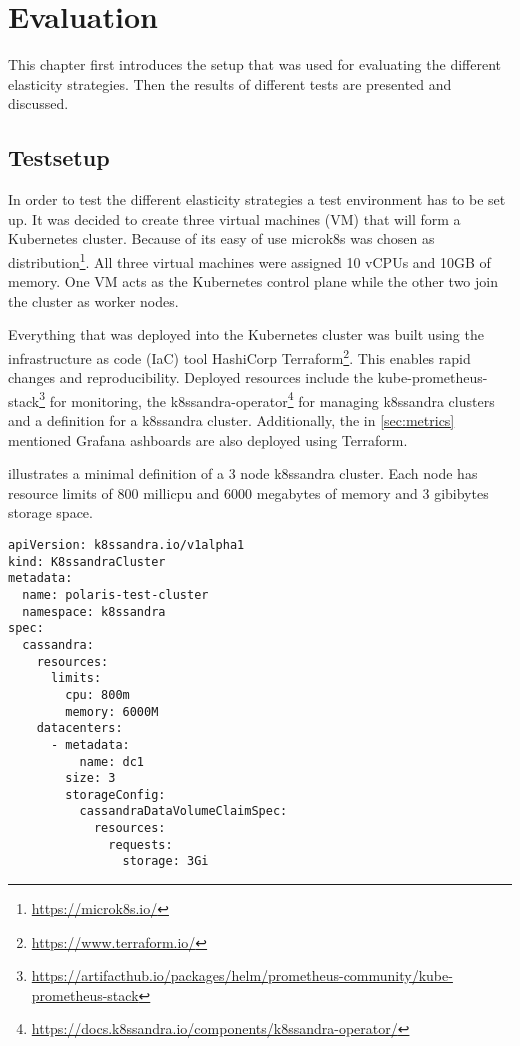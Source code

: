 \chapter{Evaluation}
\label{ch:evaluation}

This chapter first introduces the setup that was used for evaluating the different elasticity strategies. Then the results of different tests are presented and discussed.

\section{Testsetup}
\label{sec:testsetup}

In order to test the different elasticity strategies a test environment has to be set up. It was decided to create three virtual machines (VM) that will form a Kubernetes cluster. Because of its easy of use microk8s was chosen as distribution\footnote{\url{https://microk8s.io/}}. All three virtual machines were assigned 10 vCPUs and 10GB of memory. One VM acts as the Kubernetes control plane while the other two join the cluster as worker nodes.

Everything that was deployed into the Kubernetes cluster was built using the infrastructure as code (IaC) tool HashiCorp Terraform\footnote{\url{https://www.terraform.io/}}. This enables rapid changes and reproducibility. Deployed resources include the kube-prometheus-stack\footnote{\raggedright\url{https://artifacthub.io/packages/helm/prometheus-community/kube-prometheus-stack}} for monitoring, the k8ssandra-operator\footnote{\url{https://docs.k8ssandra.io/components/k8ssandra-operator/}} for managing k8ssandra clusters and a definition for a k8ssandra cluster. Additionally, the in \cref{sec:metrics} mentioned Grafana ashboards are also deployed using Terraform.

 illustrates a minimal definition of a 3 node k8ssandra cluster. Each node has resource limits of 800 millicpu and 6000 megabytes of memory and 3 gibibytes storage space.

\begin{lstlisting}[caption={Minimal example of a K8ssandraCluster definition.},
                label=lst:k8c,
                captionpos=b,
                float]
apiVersion: k8ssandra.io/v1alpha1
kind: K8ssandraCluster
metadata:
  name: polaris-test-cluster
  namespace: k8ssandra
spec:
  cassandra:
    resources:
      limits:
        cpu: 800m
        memory: 6000M
    datacenters:
      - metadata:
          name: dc1
        size: 3
        storageConfig:
          cassandraDataVolumeClaimSpec:
            resources:
              requests:
                storage: 3Gi
\end{lstlisting}

